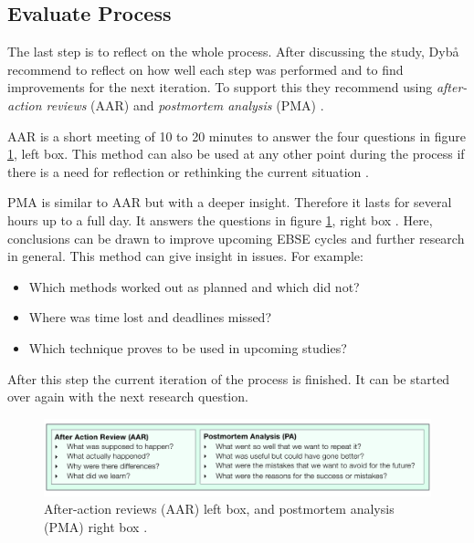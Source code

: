 
\subsection{Evaluate Process}
\label{subsec:evaluate process}

The last step is to reflect on the whole process. After discussing the study, Dyb{\aa} \etal recommend to reflect on how well each step was performed and to find improvements for the next iteration. To support this they recommend using \emph{after-action reviews} (AAR) and \emph{postmortem analysis} (PMA) \cite{Dyba2005}.

AAR is a short meeting of 10 to 20 minutes to answer the four questions in figure \ref{fig:aar_pma}, left box. This method can also be used at any other point during the process if there is a need for reflection or rethinking the current situation \cite{Dyba2005}.

PMA is similar to AAR but with a deeper insight. Therefore it lasts for several hours up to a full day. It answers the questions in figure \ref{fig:aar_pma}, right box \cite{Dyba2005}. Here, conclusions can be drawn to improve upcoming EBSE cycles and further research in general. This method can give insight in issues. For example:
\begin{itemize}
\item Which methods worked out as planned and which did not?
\item Where was time lost and deadlines missed?
\item Which technique proves to be used in upcoming studies?
\end{itemize}

After this step the current iteration of the process is finished. It can be started over again with the next research question.

\begin{figure}
	\centering
	\includegraphics[width=12.5cm]{figures/aar_pma.pdf}
	\caption{After-action reviews (AAR) left box, and postmortem analysis (PMA) right box \cite{Dyba2005}.}
	\label{fig:aar_pma}
\end{figure}
